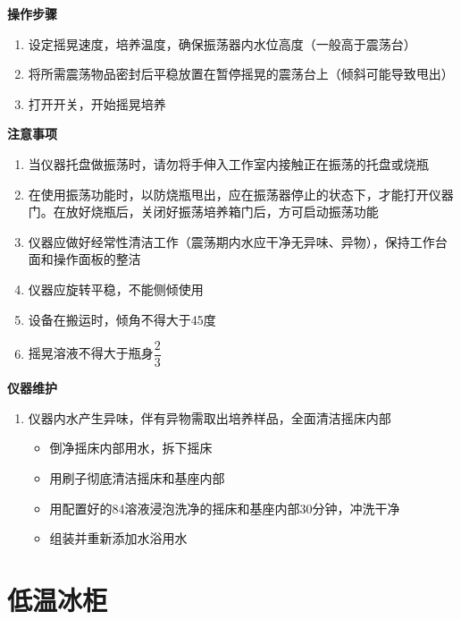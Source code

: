 \documentclass[
]{book}
\providecommand{\tightlist}{%
  \setlength{\itemsep}{0pt}\setlength{\parskip}{0pt}}
\begin{document}
\textbf{操作步骤}

\begin{enumerate}
\def\labelenumi{\arabic{enumi}.}
\tightlist
\item
  设定摇晃速度，培养温度，确保振荡器内水位高度（一般高于震荡台）
\item
  将所需震荡物品密封后平稳放置在暂停摇晃的震荡台上（倾斜可能导致甩出）
\item
  打开开关，开始摇晃培养
\end{enumerate}

\textbf{注意事项}

\begin{enumerate}
\def\labelenumi{\arabic{enumi}.}
\tightlist
\item
  当仪器托盘做振荡时，请勿将手伸入工作室内接触正在振荡的托盘或烧瓶
\item
  在使用振荡功能时，以防烧瓶甩出，应在振荡器停止的状态下，才能打开仪器门。在放好烧瓶后，关闭好振荡培养箱门后，方可启动振荡功能
\item
  仪器应做好经常性清洁工作（震荡期内水应干净无异味、异物），保持工作台面和操作面板的整洁
\item
  仪器应旋转平稳，不能侧倾使用
\item
  设备在搬运时，倾角不得大于45度
\item
  摇晃溶液不得大于瓶身\(\dfrac{2}{3}\)
\end{enumerate}

\textbf{仪器维护}

\begin{enumerate}
\def\labelenumi{\arabic{enumi}.}
\tightlist
\item
  仪器内水产生异味，伴有异物需取出培养样品，全面清洁摇床内部

  \begin{itemize}
  \tightlist
  \item
    倒净摇床内部用水，拆下摇床
  \item
    用刷子彻底清洁摇床和基座内部
  \item
    用配置好的84溶液浸泡洗净的摇床和基座内部30分钟，冲洗干净
  \item
    组装并重新添加水浴用水
  \end{itemize}
\end{enumerate}

\hypertarget{ux4f4eux6e29ux51b0ux67dc}{%
\section{低温冰柜}\label{ux4f4eux6e29ux51b0ux67dc}}
\end{document}
